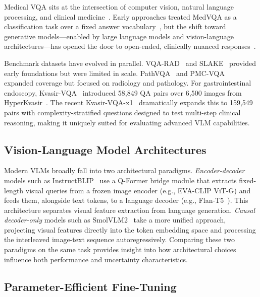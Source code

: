 \documentclass[pdflatex,sn-mathphys-num]{sn-jnl}
\begin{document}
Medical VQA sits at the intersection of computer vision, natural language processing, and clinical medicine~\cite{hasan2018overview,lin2023medvqa}. Early approaches treated MedVQA as a classification task over a fixed answer vocabulary~\cite{abacha2019vqarad}, but the shift toward generative models---enabled by large language models and vision-language architectures---has opened the door to open-ended, clinically nuanced responses~\cite{li2023llava_med,dai2023instructblip}.

Benchmark datasets have evolved in parallel. VQA-RAD~\cite{abacha2019vqarad} and SLAKE~\cite{liu2021slake} provided early foundations but were limited in scale. PathVQA~\cite{he2020pathvqa} and PMC-VQA~\cite{zhang2023pmcvqa} expanded coverage but focused on radiology and pathology. For gastrointestinal endoscopy, Kvasir-VQA~\cite{gautam2023kvasirvqa} introduced 58,849 QA pairs over 6,500 images from HyperKvasir~\cite{borgli2020hyperkvasir}. The recent Kvasir-VQA-x1~\cite{gautam2025kvasirx1} dramatically expands this to 159,549 pairs with complexity-stratified questions designed to test multi-step clinical reasoning, making it uniquely suited for evaluating advanced VLM capabilities.

\subsection{Vision-Language Model Architectures}

Modern VLMs broadly fall into two architectural paradigms. \textit{Encoder-decoder} models such as InstructBLIP~\cite{dai2023instructblip} use a Q-Former bridge module that extracts fixed-length visual queries from a frozen image encoder (e.g., EVA-CLIP ViT-G) and feeds them, alongside text tokens, to a language decoder (e.g., Flan-T5~\cite{chung2024scaling}). This architecture separates visual feature extraction from language generation. \textit{Causal decoder-only} models such as SmolVLM2~\cite{allal2025smolvlm} take a more unified approach, projecting visual features directly into the token embedding space and processing the interleaved image-text sequence autoregressively. Comparing these two paradigms on the same task provides insight into how architectural choices influence both performance and uncertainty characteristics.

\subsection{Parameter-Efficient Fine-Tuning}
\end{document}
